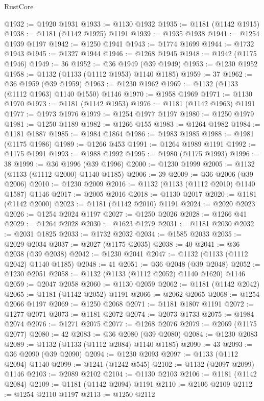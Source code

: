\begin{lexlean}{RustCore}
\begin{coremodule}
@1932 := @1920 @1931
@1933 := @1130 @1932
@1935 := @1181 (@1142 @1915)
@1938 := @1181 (@1142 @1925) @1191
@1939 := @1935 @1938
@1941 := @1254 @1939 @1197
@1942 := @1250 @1941
@1943 := @1774 @1699
@1944 := @1732 @1943
@1945 := @1327 @1944
@1946 := @1268 @1945
@1948 := @1942 (@1175 @1946)
@1949 := 36
@1952 := @36 @1949 (@39 @1949)
@1953 := @1230 @1952
@1958 := @1132 (@1133 (@1112 @1953) @1140 @1185)
@1959 := 37
@1962 := @36 @1959 (@39 @1959)
@1963 := @1230 @1962
@1969 := @1132 (@1133 (@1112 @1963) @1140 @1550) @1146
@1970 := @1958 @1969
@1971 := @1130 @1970
@1973 := @1181 (@1142 @1953)
@1976 := @1181 (@1142 @1963) @1191
@1977 := @1973 @1976
@1979 := @1254 @1977 @1197
@1980 := @1250 @1979
@1981 := @1250 @1189
@1982 := @1266 @155
@1983 := @1264 @1982
@1984 := @1181 @1887
@1985 := @1984 @1864
@1986 := @1983 @1985
@1988 := @1981 (@1175 @1986)
@1989 := @1266 @453
@1991 := @1264 @1989 @1191
@1992 := @1175 @1991
@1993 := @1988 @1992
@1995 := @1980 (@1175 @1993)
@1996 := 38
@1999 := @36 @1996 (@39 @1996)
@2000 := @1230 @1999
@2005 := @1132 (@1133 (@1112 @2000) @1140 @1185)
@2006 := 39
@2009 := @36 @2006 (@39 @2006)
@2010 := @1230 @2009
@2016 := @1132 (@1133 (@1112 @2010) @1140 @1587) @1146
@2017 := @2005 @2016
@2018 := @1130 @2017
@2020 := @1181 (@1142 @2000)
@2023 := @1181 (@1142 @2010) @1191
@2024 := @2020 @2023
@2026 := @1254 @2024 @1197
@2027 := @1250 @2026
@2028 := @1266 @41
@2029 := @1264 @2028
@2030 := @1623 @1279
@2031 := @1181 @2030
@2032 := @2031 @1825
@2033 := @1732 @2032
@2034 := @1585 @2033
@2035 := @2029 @2034
@2037 := @2027 (@1175 @2035)
@2038 := 40
@2041 := @36 @2038 (@39 @2038)
@2042 := @1230 @2041
@2047 := @1132 (@1133 (@1112 @2042) @1140 @1185)
@2048 := 41
@2051 := @36 @2048 (@39 @2048)
@2052 := @1230 @2051
@2058 := @1132 (@1133 (@1112 @2052) @1140 @1620) @1146
@2059 := @2047 @2058
@2060 := @1130 @2059
@2062 := @1181 (@1142 @2042)
@2065 := @1181 (@1142 @2052) @1191
@2066 := @2062 @2065
@2068 := @1254 @2066 @1197
@2069 := @1250 @2068
@2071 := @1181 @1807 @1191
@2072 := @1277 @2071
@2073 := @1181 @2072
@2074 := @2073 @1733
@2075 := @1984 @2074
@2076 := @1271 @2075
@2077 := @1268 @2076
@2079 := @2069 (@1175 @2077)
@2080 := 42
@2083 := @36 @2080 (@39 @2080)
@2084 := @1230 @2083
@2089 := @1132 (@1133 (@1112 @2084) @1140 @1185)
@2090 := 43
@2093 := @36 @2090 (@39 @2090)
@2094 := @1230 @2093
@2097 := @1133 (@1112 @2094) @1140
@2099 := @1241 (@1242 @545)
@2102 := @1132 (@2097 @2099) @1146
@2103 := @2089 @2102
@2104 := @1130 @2103
@2106 := @1181 (@1142 @2084)
@2109 := @1181 (@1142 @2094) @1191
@2110 := @2106 @2109
@2112 := @1254 @2110 @1197
@2113 := @1250 @2112

\end{coremodule}
\end{lexlean}
